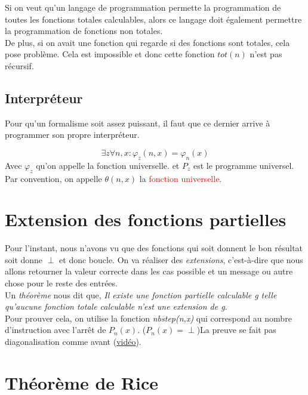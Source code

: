 \documentclass{report}
\begin{document}
Si on veut qu’un langage de programmation permette la programmation de toutes les fonctions totales calculables, alors ce langage doit également permettre
la programmation de fonctions non totales.\\

De plus, si on avait une fonction qui regarde si des fonctions sont totales, cela pose problème. Cela est impossible et donc cette fonction $tot(n)$ n'est pas récursif.

\subsection{Interpréteur}
Pour qu'un formalisme soit assez puissant, il faut que ce dernier arrive à programmer son propre interpréteur.

\begin{equation}
\exists z \forall n,x : \varphi_z(n,x) = \varphi_n(x)
\end{equation}
Avec $\varphi_z$ qu'on appelle la fonction universelle. et $P_z$ est le programme universel. Par convention, on appelle $\theta(n,x)$ la \textcolor{red}{fonction universelle}.

\section{Extension des fonctions partielles}
Pour l'instant, nous n'avons vu que des fonctions qui soit donnent le bon résultat soit donne $\perp$ et donc boucle. On va réaliser des \textit{extensions}, c'est-à-dire que nous allons retourner la valeur correcte dans les cas possible et un message ou autre chose pour le reste des entrées.\\

Un \textit{théorème} nous dit que, \textit{Il existe une fonction partielle calculable g telle qu’aucune fonction totale calculable n’est une extension de g}.\\
Pour prouver cela, on utilise la fonction \textit{nbstep(n,x)} qui correspond au nombre d'instruction avec l'arrêt de $P_n(x)$. ($P_n(x) = \perp$)La preuve se fait pas diagonalisation comme avant (\href{http://ezcast.uclouvain.be/ezplayer/index.php?action=view_asset_bookmark&album=LINFO1123-pub&asset=2021_02_17_21h51_34s&t=224&type=cam&token=EVKUMNQV}{vidéo}).\\

\section{Théorème de Rice}
\end{document}
